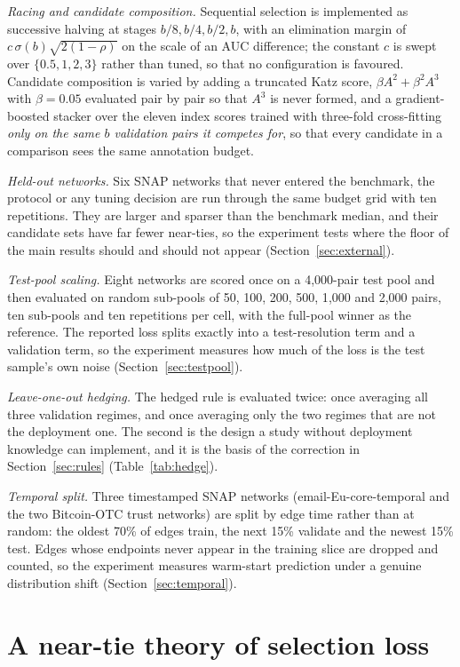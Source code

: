 \documentclass{comjnl}
\begin{document}
\emph{Racing and candidate composition.} Sequential selection is implemented as successive halving at stages $b/8,b/4,b/2,b$, with an elimination margin of $c\,\sigma(b)\sqrt{2(1-\rho)}$ on the scale of an AUC difference; the constant $c$ is swept over $\{0.5,1,2,3\}$ rather than tuned, so that no configuration is favoured. Candidate composition is varied by adding a truncated Katz score, $\beta A^2+\beta^2A^3$ with $\beta=0.05$ evaluated pair by pair so that $A^3$ is never formed, and a gradient-boosted stacker over the eleven index scores trained with three-fold cross-fitting \emph{only on the same $b$ validation pairs it competes for}, so that every candidate in a comparison sees the same annotation budget.

\emph{Held-out networks.} Six SNAP networks that never entered the benchmark, the protocol or any tuning decision are run through the same budget grid with ten repetitions. They are larger and sparser than the benchmark median, and their candidate sets have far fewer near-ties, so the experiment tests where the floor of the main results should and should not appear (Section~\ref{sec:external}).

\emph{Test-pool scaling.} Eight networks are scored once on a 4{,}000-pair test pool and then evaluated on random sub-pools of 50, 100, 200, 500, 1{,}000 and 2{,}000 pairs, ten sub-pools and ten repetitions per cell, with the full-pool winner as the reference. The reported loss splits exactly into a test-resolution term and a validation term, so the experiment measures how much of the loss is the test sample's own noise (Section~\ref{sec:testpool}).

\emph{Leave-one-out hedging.} The hedged rule is evaluated twice: once averaging all three validation regimes, and once averaging only the two regimes that are not the deployment one. The second is the design a study without deployment knowledge can implement, and it is the basis of the correction in Section~\ref{sec:rules} (Table~\ref{tab:hedge}).

\emph{Temporal split.} Three timestamped SNAP networks (email-Eu-core-temporal and the two Bitcoin-OTC trust networks) are split by edge time rather than at random: the oldest 70\% of edges train, the next 15\% validate and the newest 15\% test. Edges whose endpoints never appear in the training slice are dropped and counted, so the experiment measures warm-start prediction under a genuine distribution shift (Section~\ref{sec:temporal}).

\section{A near-tie theory of selection loss}
\label{sec:theory}
\end{document}
